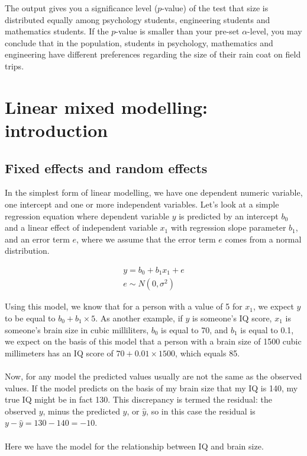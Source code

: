 \documentclass[]{book}\usepackage[]{graphicx}\usepackage[]{color}
\begin{document}
The output gives you a significance level ($p$-value) of the test that size is distributed equally among psychology students, engineering students and mathematics students. If the $p$-value is smaller than your pre-set $\alpha$-level, you may conclude that in the population, students in psychology, mathematics and engineering have different preferences regarding the size of their rain coat on field trips. 






\chapter{Linear mixed modelling: introduction}\label{chap:mixed}


\section{Fixed effects and random effects}
In the simplest form of linear modelling, we have one dependent numeric variable, one intercept and one or more independent variables. Let's look at a simple regression equation where dependent variable $y$ is predicted by an intercept $b_0$ and a linear effect of independent variable $x_1$ with regression slope parameter $b_1$, and an error term $e$, where we assume that the error term $e$ comes from a normal distribution. 


\begin{eqnarray}
y = b_0 + b_1 x_1 + e \\
e \sim N(0, \sigma^2)
\end{eqnarray}

Using this model, we know that for a person with a value of 5 for $x_1$, we expect $y$ to be equal to $b_0 + b_1 \times 5$. As another example, if $y$ is someone's IQ score, $x_1$ is someone's brain size in cubic milliliters, $b_0$ is equal to 70, and $b_1$ is equal to 0.1, we expect on the basis of this model that a person with a brain size of 1500 cubic millimeters has an IQ score of $70 + 0.01 \times 1500$, which equals 85.
\\
\\
Now, for any model the predicted values usually are not the same as the observed values. If the model predicts on the basis of my brain size that my IQ is 140, my true IQ might be in fact 130. This discrepancy is termed the residual: the observed $y$, minus the predicted $y$, or $\hat{y}$, so in this case the residual is $y - \hat{y}=130-140= -10$.
\\
\\
Here we have the model for the relationship between IQ and brain size.
\end{document}
